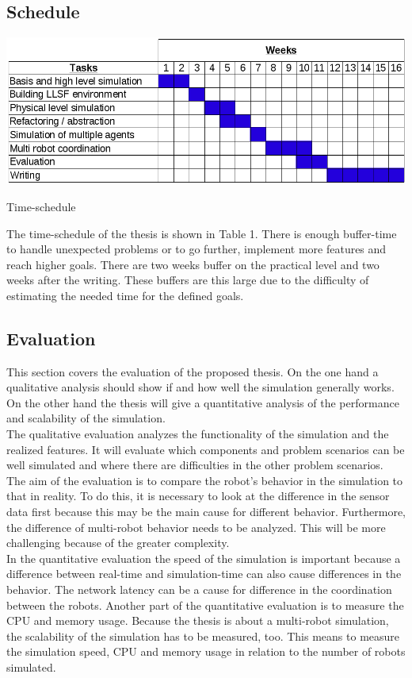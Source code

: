 \documentclass[a4paper,11pt]{article}
\begin{document}
\subsection{Schedule}
\begin{table}
\centering
\includegraphics[scale=0.45]{pics/Schedule.png}
\label{Table 1}
\caption{Time-schedule}
\end{table}

The time-schedule of the thesis is shown in Table 1. There is enough buffer-time to handle unexpected problems or to go further, implement more features and reach higher goals. There are two weeks buffer on the practical level and two weeks after the writing. These buffers are this large due to the difficulty of estimating the needed time for the defined goals.

\subsection{Evaluation}
This section covers the evaluation of the proposed thesis. On the one hand a qualitative analysis should show if and how well the simulation generally works. On the other hand the thesis will give a quantitative analysis of the performance and scalability of the simulation.\\
The qualitative evaluation analyzes the functionality of the simulation and the realized features. It will evaluate which components and problem scenarios can be well simulated and where there are difficulties in the other problem scenarios. The aim of the evaluation is to compare the robot's behavior in the simulation to that in reality. To do this, it is necessary to look at the difference in the sensor data first because this may be the main cause for different behavior. Furthermore, the difference of multi-robot behavior needs to be analyzed. This will be more challenging because of the greater complexity.\\
In the quantitative evaluation the speed of the simulation is important because a difference between real-time and simulation-time can also cause differences in the behavior. The network latency can be a cause for difference in the coordination between the robots. Another part of the quantitative evaluation is to measure the CPU and memory usage. Because the thesis is about a multi-robot simulation, the scalability of the simulation has to be measured, too. This means to measure the simulation speed, CPU and memory usage in relation to the number of robots simulated.
\end{document}
